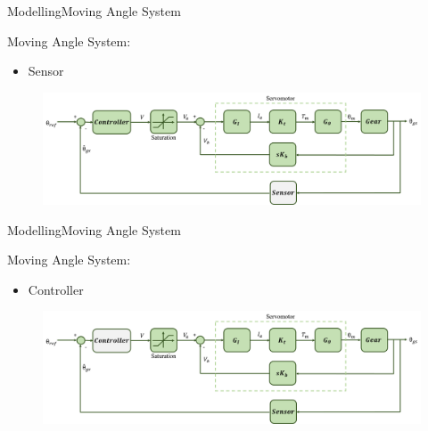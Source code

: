 \begin{frame}{Modelling}{Moving Angle System}
  \begin{block}{Moving Angle System:}

	  \begin{itemize}
	  	\item Sensor
	  \end{itemize}

	  \begin{figure}
        \includegraphics[scale=0.24]{../report/figures/servo+gear+noise+sensor.png}
      \end{figure}
  
  \end{block}
\end{frame}


\begin{frame}{Modelling}{Moving Angle System}
  \begin{block}{Moving Angle System:}
	  \begin{itemize}
	  	\item Controller
	  \end{itemize}
	  \begin{figure}
        \includegraphics[scale=0.24]{../report/figures/servo+gear+noise+controller.png}
      \end{figure}
  \end{block}
\end{frame}

